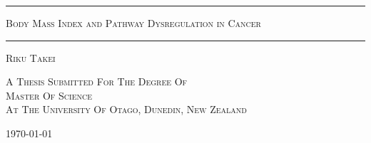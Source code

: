 \begin{titlepage}

\centering

\rule[2.0mm]{\textwidth}{0.5mm}

\begin{doublespace}
    {\Huge \scshape Body Mass Index and Pathway Dysregulation in Cancer}
\end{doublespace}

\rule[2.0mm]{\textwidth}{0.5mm}

\vspace{2.0mm}
{\Large \scshape Riku Takei}

\vfill



{\normalsize \scshape A Thesis Submitted For The Degree Of\\}
{\Large \scshape Master Of Science\\}
\vspace{2.0mm}
{\normalsize \scshape At The University Of Otago, Dunedin, New Zealand \\}

\vspace{10.0mm}
{\normalsize \today}

\end{titlepage}
